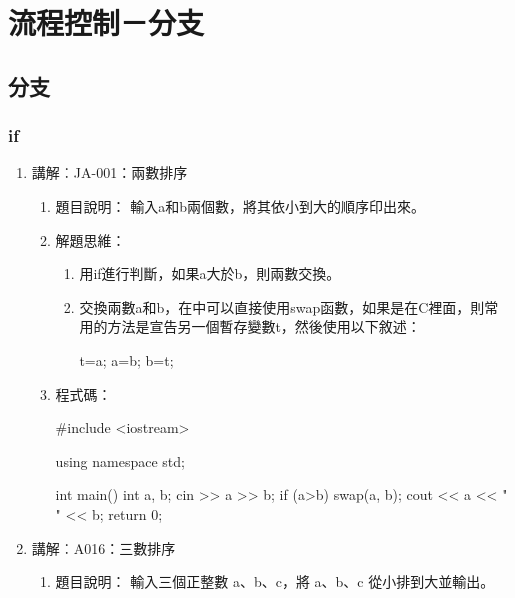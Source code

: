 
\section{流程控制－分支}

	

\subsection{分支}

\subsubsection{if}
\begin{enumerate}
	\item 講解︰JA-001：兩數排序
		\begin{enumerate}
			\item 題目說明：
			\subitem 輸入a和b兩個數，將其依小到大的順序印出來。
			
			\item 解題思維：
			\begin{enumerate}
				\item 用if進行判斷，如果a大於b，則兩數交換。
				
				\item 交換兩數a和b，在\cc{}中可以直接使用swap函數，如果是在C裡面，則常用的方法是宣告另一個暫存變數t，然後使用以下敘述：
				\begin{inside}
				t=a; a=b; b=t;
				\end{inside}
			\end{enumerate}
			\item 程式碼：
			\begin{cppcode}
				#include <iostream>
				
				using namespace std;
				
				int main()
				{
					int a, b;
					cin >> a >> b;
					if (a>b) swap(a, b);
					cout << a << " " << b;
					return 0;
				}
					
			\end{cppcode}
		\end{enumerate}
	\item 講解︰A016：三數排序
		\begin{enumerate}
			\item 題目說明：
			\subitem 輸入三個正整數 a、b、c，將 a、b、c 從小排到大並輸出。
			

\end{enumerate}
\end{enumerate}
